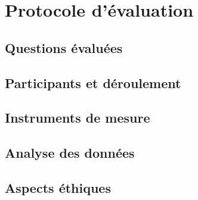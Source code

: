 
\chapter{Protocole d'évaluation}\label{chap:protocole}

\section{Questions évaluées}

\section{Participants et déroulement}

\section{Instruments de mesure}

\section{Analyse des données}

\section{Aspects éthiques}
